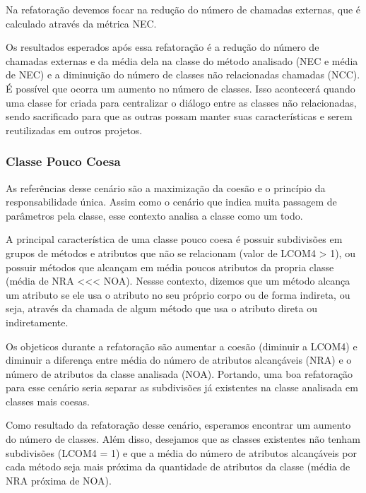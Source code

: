 	Na refatoração devemos focar na redução do número de chamadas externas, que é calculado através da métrica NEC.
	
	Os resultados esperados após essa refatoração é a redução do número de chamadas externas e da média dela na classe do método analisado (NEC e média de NEC) e a diminuição do número de classes não relacionadas chamadas (NCC). É possível que ocorra um aumento no número de classes. Isso acontecerá quando uma classe for criada para centralizar o diálogo entre as classes não relacionadas, sendo sacrificado para que as outras possam manter suas características e serem reutilizadas em outros projetos. 
	
	

\subsubsection{Classe Pouco Coesa}

	As referências desse cenário são a maximização da coesão e o princípio da responsabilidade única. Assim como o cenário que indica muita passagem de parâmetros pela classe, esse contexto analisa a classe como um todo.
	
	A principal característica de uma classe pouco coesa é possuir subdivisões em grupos de métodos e atributos que não se relacionam (valor de LCOM4 > 1), ou possuir métodos que alcançam em média poucos atributos da propria classe (média de NRA <<< NOA). Nessse contexto, dizemos que um método alcança um atributo se ele usa o atributo no seu próprio corpo ou de forma indireta, ou seja, através da chamada de algum método que usa o atributo direta ou indiretamente.
	
	Os objeticos durante a refatoração são aumentar a coesão (diminuir a LCOM4) e diminuir a diferença entre média do número de atributos alcançáveis (NRA) e o número de atributos da classe analisada (NOA). Portando, uma boa refatoração para esse cenário seria separar as subdivisões já existentes na classe analisada em classes mais coesas.
	
	Como resultado da refatoração desse cenário, esperamos encontrar um aumento do número de classes. Além disso, desejamos que as classes existentes não tenham subdivisões (LCOM4 = 1) e que a média do número de atributos alcançáveis por cada método seja mais próxima da quantidade de atributos da classe (média de NRA próxima de NOA).
	






